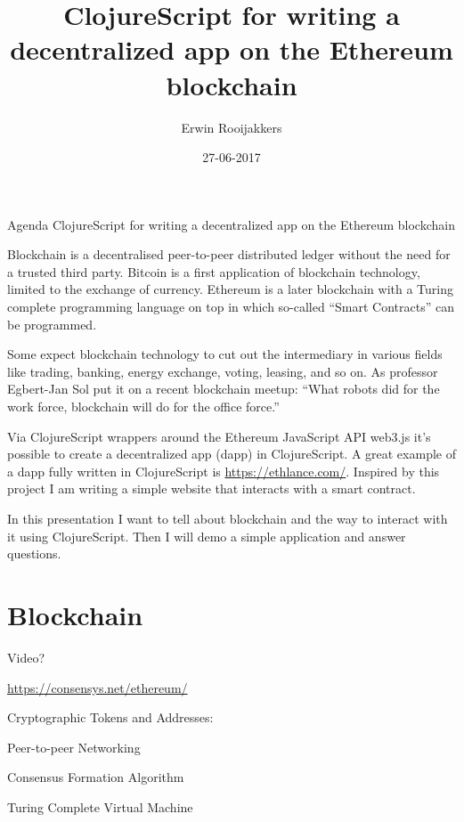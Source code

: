 \documentclass[presentation]{beamer}
\author{Erwin Rooijakkers}
\date{27-06-2017}
\title{ClojureScript for writing a decentralized app on the Ethereum blockchain}
\begin{document}
\maketitle

\begin{frame}[label=sec-0-1]{Agenda}
\alert{ClojureScript for writing a decentralized app on the Ethereum blockchain}

Blockchain is a decentralised peer-to-peer distributed ledger without the need
for a trusted third party. Bitcoin is a first application of blockchain
technology, limited to the exchange of currency. Ethereum is a later blockchain
with a Turing complete programming language on top in which so-called “Smart
Contracts” can be programmed.

Some expect blockchain technology to cut out the intermediary in various fields
like trading, banking, energy exchange, voting, leasing, and so on. As professor
Egbert-Jan Sol put it on a recent blockchain meetup: “What robots did for the
work force, blockchain will do for the office force.”

Via ClojureScript wrappers around the Ethereum JavaScript API web3.js it’s
possible to create a decentralized app (dapp) in ClojureScript. A great example
of a dapp fully written in ClojureScript is \url{https://ethlance.com/}. Inspired by
this project I am writing a simple website that interacts with a smart contract.

In this presentation I want to tell about blockchain and the way to interact
with it using ClojureScript. Then I will demo a simple application and answer
questions.
\end{frame}

\section{Blockchain}
\label{sec-1}

Video?

\url{https://consensys.net/ethereum/}

\begin{frame}[label=sec-1-1]{Cryptographic Tokens and Addresses:}
\end{frame}
\begin{frame}[label=sec-1-2]{Peer-to-peer Networking}
\end{frame}
\begin{frame}[label=sec-1-3]{Consensus Formation Algorithm}
\end{frame}
\begin{frame}[label=sec-1-4]{Turing Complete Virtual Machine}
\end{frame}
\end{document}

